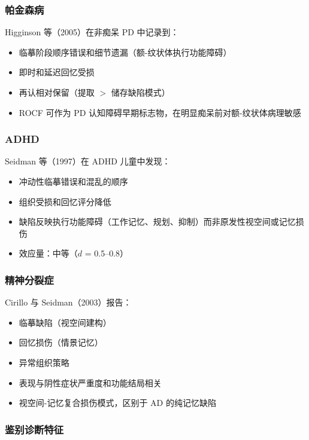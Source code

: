 \documentclass[12pt,a4paper]{ctexart}
\begin{document}
\subsubsection{帕金森病}

Higginson 等（2005）在非痴呆 PD 中记录到：

\begin{itemize}
\item 临摹阶段顺序错误和细节遗漏（额-纹状体执行功能障碍）
\item 即时和延迟回忆受损
\item 再认相对保留（提取 $>$ 储存缺陷模式）
\item ROCF 可作为 PD 认知障碍早期标志物，在明显痴呆前对额-纹状体病理敏感
\end{itemize}

\subsubsection{ADHD}

Seidman 等（1997）在 ADHD 儿童中发现：

\begin{itemize}
\item 冲动性临摹错误和混乱的顺序
\item 组织受损和回忆评分降低
\item 缺陷反映执行功能障碍（工作记忆、规划、抑制）而非原发性视空间或记忆损伤
\item 效应量：中等（$d$ = 0.5–0.8）
\end{itemize}

\subsubsection{精神分裂症}

Cirillo 与 Seidman（2003）报告：

\begin{itemize}
\item 临摹缺陷（视空间建构）
\item 回忆损伤（情景记忆）
\item 异常组织策略
\item 表现与阴性症状严重度和功能结局相关
\item 视空间-记忆复合损伤模式，区别于 AD 的纯记忆缺陷
\end{itemize}

\subsubsection{鉴别诊断特征}
\end{document}
